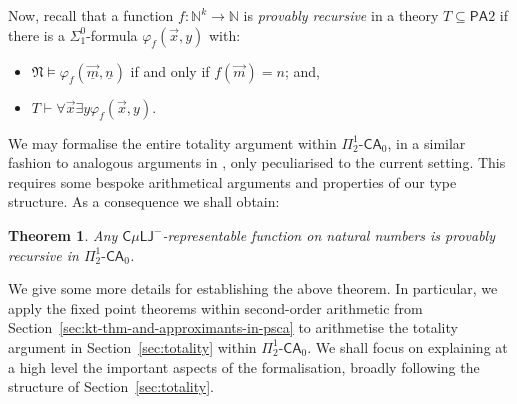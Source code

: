 \documentclass[10pt,a4paper]{amsart}
\theoremstyle{plain}
\newtheorem{theorem}[theorem]{Theorem}
\newtheorem{corollary}[corollary]{Corollary}
\theoremstyle{definition}
\renewcommand{\phi}{\varphi}
\theoremstyle{plain}
\theoremstyle{definition} %
\newcommand{\numeral}[1]{\underline{#1}}
\newcommand{\Nat}{\mathbb{N}}
\newcommand{\LJ}{\mathsf{LJ}}
\newcommand{\muLJ}{\mu\LJ}
\newcommand{\circular}{\mathsf C}
\newcommand{\cmuLJ}{\circular\muLJ}
\newcommand{\cmuLJneg}{\cmuLJ^-}
\newcommand{\proves}{\vdash}
\newcommand{\Sin}[2]{\Sigma^{#1}_{#2}}
\newcommand{\Pin}[2]{\Pi^{#1}_{#2}}
\newcommand{\Din}[2]{\Delta^{#1}_{#2}}
\newcommand{\posDin}[3]{\Din{#1,+}{#2} (#3)}
\newcommand{\posnegDin}[4]{\posDin{#1}{#2}{#3, \lnot #4}}
\newcommand{\PA}{\mathsf{PA}}
\newcommand{\SOPA}{\PA2}
\newcommand{\CA}{\mathsf{CA}}
\newcommand{\ca}[1]{#1\text{-}\CA}
\newcommand{\PSCA}{\ca{\Pin 1 2 }_0}
\newcommand{\hr}[1]{|#1|}
\newcommand{\nmod}{\mathfrak N}
\begin{document}


Now, recall that a function $f:\Nat^k \to \Nat$ is \emph{provably recursive} in a theory $T\subseteq \SOPA$ if there is a $\Sin 0 1 $-formula $\phi_f(\vec x,y)$ with:
\begin{itemize}
    \item $ \nmod \models \phi_f (\vec {\numeral m} , \numeral n) $ if and only if $f(\vec m) = n$; and,
    \item $T \proves \forall \vec x \exists y \phi_f (\vec x, y)$.
\end{itemize}

We may formalise the entire totality argument within $\PSCA$, in a similar fashion to analogous arguments in \cite{Das21:CT-fscd,KuperbergPP21systemT,Das21:CT-preprint}, only peculiarised to the current setting.
This requires some bespoke arithmetical arguments and properties of our type structure.
As a consequence we shall obtain:

\begin{theorem}
\label{thm:cmuLJneg-to-psca}
Any $\cmuLJneg$-representable function on natural numbers is provably recursive in $\PSCA$.
\end{theorem}


We give some more details for establishing the above theorem. In particular, we apply the fixed point theorems within second-order arithmetic from Section~\ref{sec:kt-thm-and-approximants-in-psca} to arithmetise the totality argument in Section~\ref{sec:totality} within $\PSCA$.
We shall focus on explaining at a high level the important aspects of the formalisation, broadly following the structure of Section~\ref{sec:totality}.
\end{document}
